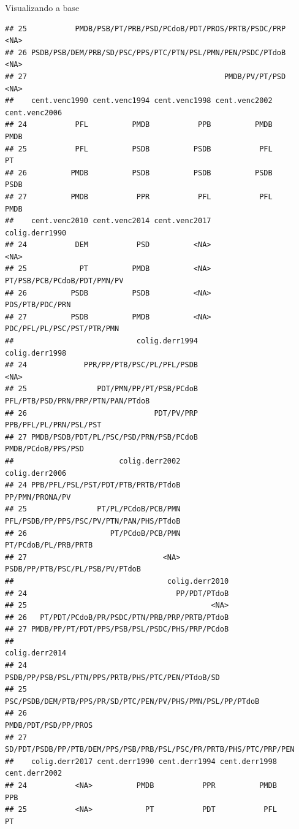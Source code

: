 \documentclass[
  10pt,
  ignorenonframetext,
]{beamer}
\begin{document}
\begin{frame}[fragile]{Visualizando a base}
\begin{verbatim}
## 25           PMDB/PSB/PT/PRB/PSD/PCdoB/PDT/PROS/PRTB/PSDC/PRP           <NA>
## 26 PSDB/PSB/DEM/PRB/SD/PSC/PPS/PTC/PTN/PSL/PMN/PEN/PSDC/PTdoB           <NA>
## 27                                             PMDB/PV/PT/PSD           <NA>
##    cent.venc1990 cent.venc1994 cent.venc1998 cent.venc2002 cent.venc2006
## 24           PFL          PMDB           PPB          PMDB          PMDB
## 25           PFL          PSDB          PSDB           PFL            PT
## 26          PMDB          PSDB          PSDB          PSDB          PSDB
## 27          PMDB           PPR           PFL           PFL          PMDB
##    cent.venc2010 cent.venc2014 cent.venc2017              colig.derr1990
## 24           DEM           PSD          <NA>                        <NA>
## 25            PT          PMDB          <NA> PT/PSB/PCB/PCdoB/PDT/PMN/PV
## 26          PSDB          PSDB          <NA>             PDS/PTB/PDC/PRN
## 27          PSDB          PMDB          <NA>  PDC/PFL/PL/PSC/PST/PTR/PMN
##                            colig.derr1994                    colig.derr1998
## 24             PPR/PP/PTB/PSC/PL/PFL/PSDB                              <NA>
## 25                PDT/PMN/PP/PT/PSB/PCdoB PFL/PTB/PSD/PRN/PRP/PTN/PAN/PTdoB
## 26                             PDT/PV/PRP            PPB/PFL/PL/PRN/PSL/PST
## 27 PMDB/PSDB/PDT/PL/PSC/PSD/PRN/PSB/PCdoB                PMDB/PCdoB/PPS/PSD
##                        colig.derr2002                           colig.derr2006
## 24 PPB/PFL/PSL/PST/PDT/PTB/PRTB/PTdoB                          PP/PMN/PRONA/PV
## 25                PT/PL/PCdoB/PCB/PMN PFL/PSDB/PP/PPS/PSC/PV/PTN/PAN/PHS/PTdoB
## 26                   PT/PCdoB/PCB/PMN                     PT/PCdoB/PL/PRB/PRTB
## 27                               <NA>          PSDB/PP/PTB/PSC/PL/PSB/PV/PTdoB
##                                   colig.derr2010
## 24                                  PP/PDT/PTdoB
## 25                                          <NA>
## 26   PT/PDT/PCdoB/PR/PSDC/PTN/PRB/PRP/PRTB/PTdoB
## 27 PMDB/PP/PT/PDT/PPS/PSB/PSL/PSDC/PHS/PRP/PCdoB
##                                                        colig.derr2014
## 24                  PSDB/PP/PSB/PSL/PTN/PPS/PRTB/PHS/PTC/PEN/PTdoB/SD
## 25         PSC/PSDB/DEM/PTB/PPS/PR/SD/PTC/PEN/PV/PHS/PMN/PSL/PP/PTdoB
## 26                                               PMDB/PDT/PSD/PP/PROS
## 27 SD/PDT/PSDB/PP/PTB/DEM/PPS/PSB/PRB/PSL/PSC/PR/PRTB/PHS/PTC/PRP/PEN
##    colig.derr2017 cent.derr1990 cent.derr1994 cent.derr1998 cent.derr2002
## 24           <NA>          PMDB           PPR          PMDB           PPB
## 25           <NA>            PT           PDT           PFL            PT

\end{verbatim}
\end{frame}
\end{document}
